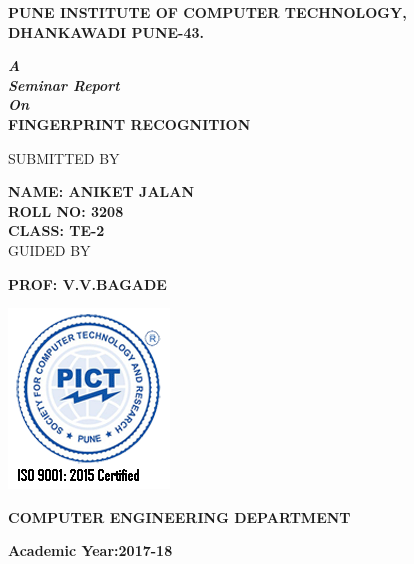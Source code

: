 \documentclass[a4paper, 12pt]{article}
\begin{document}
    \begin{center}
    	\pagestyle{fancy}
        \textbf{PUNE INSTITUTE OF COMPUTER TECHNOLOGY,}	\\
        \textbf{DHANKAWADI PUNE-43.}
        \vspace{1cm}
        
        \large
        \textbf{\textit{A}}\\
        \textbf{\textit{Seminar Report}}\\
        \textbf{\textit{On}}\\
        \vspace{0.5cm}
        \large
        \textbf{FINGERPRINT RECOGNITION}
        \linebreak
        \linebreak
		
		\small
		SUBMITTED BY \\
		\vspace{1cm} 
		
		\textbf{NAME: ANIKET JALAN}\\
		\vspace{0.5cm}
		\textbf{ROLL NO: 3208}\\
		\vspace{0.5cm}
		\textbf{CLASS: TE-2}\\
		\vspace{0.5cm}
		{GUIDED BY}
		
        \textbf{PROF: V.V.BAGADE }
        \vspace{1cm}
        
        \includegraphics[scale=0.6]{pict.png}
        \vspace{1cm}
        
		\textbf{COMPUTER ENGINEERING DEPARTMENT}
		\vspace{0.5cm}
		
		\textbf{Academic Year:2017-18}
        \Large
    \end{center}
\end{document}
